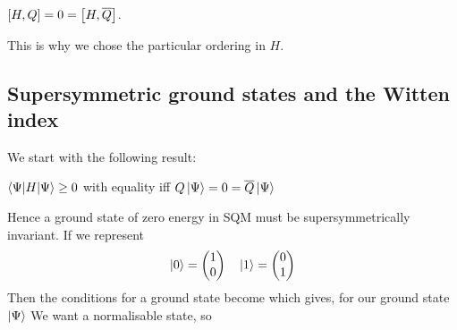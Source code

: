 \documentclass{article}
\begin{document}
\begin{corollary}
	$\comm[H]{Q} = 0 = \comm[H]{\bar{Q}}$. 
\end{corollary}

\begin{remark}
This is why we chose the particular ordering in $H$. 
\end{remark}

\subsection{Supersymmetric ground states and the Witten index}
We start with the following result:
\begin{prop}
	 $\braket{\Psi|H|\Psi}\geq 0$ with equality iff $Q\ket{\Psi}=0=\bar{Q}\ket{\Psi}$
\end{prop}
Hence a ground state of zero energy in SQM must be supersymmetrically invariant. If we represent 
\[
\ket{0} = \begin{pmatrix} 1 \\ 0 \end{pmatrix} \quad \ket{1} = \begin{pmatrix} 0 \\ 1 \end{pmatrix}
\]
Then the conditions for a ground state become 
which gives, for our ground state $\ket{\Psi}$
We want a normalisable state, so 
\end{document}
